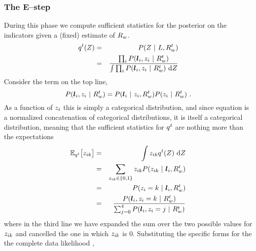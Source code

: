 \subsubsection{The E--step}

During this phase we compute sufficient statistics for the posterior on
the indicators given a (fixed) estimate of $\SceneR$.
\begin{eqnarray}
  \PosteriorEst^t(\Indicators) &=&
    P(\Indicators ~|~ \LineSegs,\SceneR^t) \\
  \label{eq:posterior-est}
  &=&
    \frac{
      \prod_i P(\LineSeg_i,\Indicator_i ~|~\SceneR^t)
    }{
      \int \prod_i P(\LineSeg_i,\Indicator_i ~|~ \SceneR^t)
      ~\intd\Indicators
    }\\
\end{eqnarray}
Consider the term on the top line,
\begin{equation}
  P(\LineSeg_i,\Indicator_i ~|~\SceneR^t)
  =
  P(\LineSeg_i ~|~ \Indicator_i,\SceneR^t)
  P(\Indicator_i ~|~ \SceneR^t) ~.
\end{equation}
As a function of $\Indicator_i$ this is simply a categorical
distribution, and since equation  is a
normalized concatenation of categorical distributions, it is
itself a categorical distribution, meaning that the sufficient
statistics for $\PosteriorEst^t$ are nothing more than the
expectations
\begin{eqnarray}
  \Expected_{\PosteriorEst^t}\bigl[ \Indicator_{ik} \bigr]
  &=& 
    \int \Indicator_{ik} \PosteriorEst^t(\Indicators) ~\intd\Indicators \\
  &=& 
    \sum_{\Indicator_{ik}\in\{0,1\}}
    \Indicator_{ik} P(\Indicator_{ik} ~|~ \LineSeg_i, \SceneR^t)\\
  &=&
    P(\Indicator_i=k ~|~ \LineSeg_i, \SceneR^t)\\
  &=&
    \label{eq:expected-zik}
    \frac
        {P( \LineSeg_i, \Indicator_i=k ~|~ \SceneR^t)}
        {\sum_{j=0}^4 P(\LineSeg_i, \Indicator_i=j ~|~ \SceneR^t)}
\end{eqnarray}
where in the third line we have expanded the sum over the two possible
values for $\Indicator_{ik}$ and cancelled the one in which
$\Indicator_{ik}$ is 0. Substituting the specific forms for the the
complete data likelihood ,
